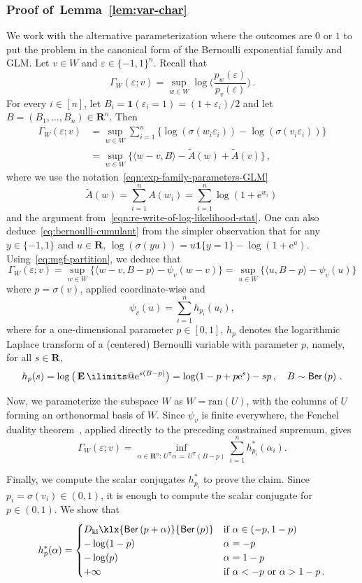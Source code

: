 \documentclass[11pt, letterpaper, hidelinks]{article}
\makeatletter
\newcommand{\R}{\mathbf R}
\newcommand{\e}{\mathrm{e}}
\newcommand{\1}{\mathbf 1}
\newcommand{\eps}{\varepsilon}
\let\tilde\widetilde
\newcommand{\T}{\mathsf{T}}
\newcommand{\kl}{D_{\rm kl}\klx}
\newcommand{\E}{\operatorname*{\mathbf{E}}\ilimits@}
\theoremstyle{plain}
\theoremstyle{definition}
\newcommand{\Ber}[1]{\mathsf{Ber}\left(#1\right)}
\newcommand{\ran}{\mathrm{ran}}
\makeatother
\begin{document}
\subsubsection{Proof of~Lemma~\ref{lem:var-char}}

We work with the alternative parameterization where the outcomes are $0$ or $1$ to put the problem in the canonical form of the Bernoulli exponential family and GLM. Let $v \in W$ and $\eps \in \{-1,1\}^n$. Recall that
\[
\Gamma_W(\eps; v)
	= \sup_{w\in W} \log\Big( \frac{p_w(\eps)}{p_v(\eps)}\Big) \, .
\]
For every $i \in [n]$, let $B_i = \1(\eps_i = 1) = (1+\eps_i)/2$ and let $B = (B_1, \dots, B_n) \in \R^n$. Then
\begin{align}
\Gamma_W(\eps; v)
	&= \sup_{w\in W} \sum_{i=1}^{n}
	\big\{\log(\sigma(w_i\eps_i))-\log(\sigma(v_i\eps_i))\big\} \\
	&= \sup_{w\in W} \big\{ \langle w - v, B \rangle - \tilde A(w) + \tilde A(v) \big\} \, , \label{eq:bernoulli-cumulant}
\end{align}
where we use the notation~\eqref{eqn:exp-family-parameters-GLM} 
\[
\tilde A(w) =  \sum_{i=1}^{n} A(w_i) =  \sum_{i=1}^{n} \log(1+\e^{w_i}) \, 
\]
and the argument from~\eqref{eqn:re-write-of-log-likelihood-stat}. One can also deduce~\eqref{eq:bernoulli-cumulant} from the simpler observation that for any $y\in\{-1,1\}$ and $u\in\R$, $\log(\sigma(yu)) = u \1\{y=1\} - \log(1+\e^u)$. Using~\eqref{eq:mgf-partition}, we deduce that
\[
\Gamma_W(\eps; v)
	= \sup_{w\in W}\big\{ \langle w-v, B-p \rangle - \psi_v(w-v)\big\}
	= \sup_{u \in W}\big\{ \langle u, B-p \rangle - \psi_v(u)\big\}
\]
where $p = \sigma(v)$, applied coordinate-wise  and
\[
\psi_v(u) = \sum_{i=1}^n h_{p_i}(u_i),
\] 
where for a one-dimensional parameter $p\in [0,1]$, $h_p$ denotes the logarithmic Laplace transform of a (centered) Bernoulli variable with parameter $p$, namely, for all $s \in \R$,
\[
h_p(s)
	= \log\big( \E \e^{s (B - p)} \big)
	= \log(1-p + p\e^{s}) - sp \, , \quad B \sim \Ber{p} \, .
\]

Now, we parameterize the subspace $W$ as $W=\ran(U)$, with the columns of $U$ forming an orthonormal basis of $W$. Since $\psi_v$ is finite everywhere, the Fenchel duality theorem~\cite[Theorem~31.1]{rockafellar1970convex}, applied directly to the preceding constrained supremum, gives
\[
\Gamma_W(\eps; v)
	= \inf_{\alpha\in\R^n:\,U^\T\!\alpha\,=\,U^\T(B-p)}
    \sum_{i=1}^n h_{p_i}^\ast(\alpha_i).
\]

Finally, we compute the scalar conjugates $h_{p_i}^*$ to prove the claim. Since $p_i=\sigma(v_i)\in(0,1)$, it is enough to compute the scalar conjugate for $p\in(0,1)$. We show that
\begin{equation}
h_p^*(\alpha)= 
\begin{cases}
    \kl{\Ber{p+\alpha}}{\Ber{p}} & \mbox{if}~\alpha \in(-p, 1-p) \\ 
    -\log(1-p) & \alpha = -p\\
    -\log(p) & \alpha = 1-p \\
    +\infty & \mbox{if}~ \alpha < -p~\mbox{or}~\alpha > 1 -p \, .
\end{cases}
\end{equation}
\end{document}
